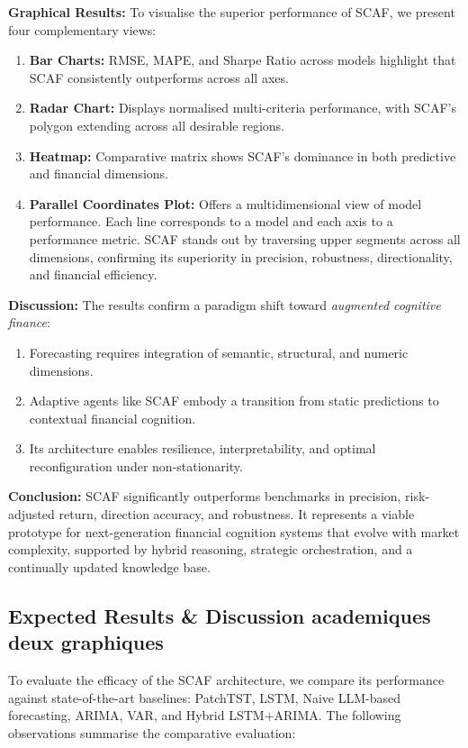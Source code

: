 \documentclass[conference]{IEEEtran}
\begin{document}
\textbf{Graphical Results:}
To visualise the superior performance of SCAF, we present four complementary views:
\begin{enumerate}
    \item \textbf{Bar Charts:} RMSE, MAPE, and Sharpe Ratio across models highlight that SCAF consistently outperforms across all axes.
    \item \textbf{Radar Chart:} Displays normalised multi-criteria performance, with SCAF's polygon extending across all desirable regions.
    \item \textbf{Heatmap:} Comparative matrix shows SCAF’s dominance in both predictive and financial dimensions.
    \item \textbf{Parallel Coordinates Plot:} Offers a multidimensional view of model performance. Each line corresponds to a model and each axis to a performance metric. SCAF stands out by traversing upper segments across all dimensions, confirming its superiority in precision, robustness, directionality, and financial efficiency.
\end{enumerate}

\textbf{Discussion:}
The results confirm a paradigm shift toward \emph{augmented cognitive finance}:
\begin{enumerate}
    \item Forecasting requires integration of semantic, structural, and numeric dimensions.
    \item Adaptive agents like SCAF embody a transition from static predictions to contextual financial cognition.
    \item Its architecture enables resilience, interpretability, and optimal reconfiguration under non-stationarity.
\end{enumerate}

\textbf{Conclusion:}
SCAF significantly outperforms benchmarks in precision, risk-adjusted return, direction accuracy, and robustness. It represents a viable prototype for next-generation financial cognition systems that evolve with market complexity, supported by hybrid reasoning, strategic orchestration, and a continually updated knowledge base.
\subsection{Expected Results & Discussion academiques deux graphiques}
To evaluate the efficacy of the SCAF architecture, we compare its performance against state-of-the-art baselines: PatchTST, LSTM, Naive LLM-based forecasting, ARIMA, VAR, and Hybrid LSTM+ARIMA. The following observations summarise the comparative evaluation:
\end{document}
